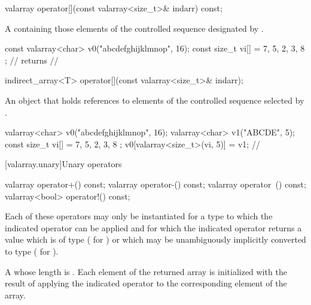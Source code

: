 %
\begin{itemdecl}
valarray operator[](const valarray<size_t>& indarr) const;
\end{itemdecl}

\begin{itemdescr}
\pnum
\returns A  containing those
elements of the controlled sequence designated by .
\begin{example}
\begin{codeblock}
const valarray<char> v0("abcdefghijklmnop", 16);
const size_t vi[] = { 7, 5, 2, 3, 8 };
//  returns
// 
\end{codeblock}
\end{example}
\end{itemdescr}

%
\begin{itemdecl}
indirect_array<T> operator[](const valarray<size_t>& indarr);
\end{itemdecl}

\begin{itemdescr}
\pnum
\returns An object that holds references to elements of the controlled
sequence selected by . \begin{example}
\begin{codeblock}
valarray<char> v0("abcdefghijklmnop", 16);
valarray<char> v1("ABCDE", 5);
const size_t vi[] = { 7, 5, 2, 3, 8 };
v0[valarray<size_t>(vi, 5)] = v1;
// 
\end{codeblock}
\end{example}
\end{itemdescr}

[valarray.unary]{Unary operators}

%
%
%
%
\begin{itemdecl}
valarray operator+() const;
valarray operator-() const;
valarray operator~() const;
valarray<bool> operator!() const;
\end{itemdecl}

\begin{itemdescr}
\pnum
\requires
Each of these operators may only be instantiated for a type 
to which the indicated operator can be applied and for which the indicated
operator returns a value which is of type  ( for
) or which may be unambiguously implicitly converted to type
 ( for ).

\pnum
\returns A  whose length is .
Each element of the returned array is initialized with the result of
applying the indicated operator to the corresponding element of the array.
\end{itemdescr}

